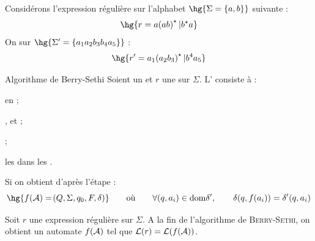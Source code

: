 \documentclass[a4paper,french,bookmarks]{book}
\begin{document}
    \begin{example}{}{}
        Considérons l'expression régulière  sur l'alphabet $\hg{\Sigma = \ens{a, b}}$ suivante :
        \[ \hg{r = a\p{ab}^\star \vert b^\star a}\]
        On  sur $\hg{\Sigma' = \ens{a_1a_2b_3b_4a_5}}$ :
        \[ \hg{r' = a_1\p{a_2b_3}^\star \vert b^4a_5 } \]
    \end{example}
    
    \begin{form}{Algorithme de Berry-Sethi}{}
        Soient \hg{$\Sigma$} un  et $r$ une  sur $\Sigma$. L' consiste à :
        
        \begin{psse}
            \item {} en  ;
            
            \item {},  et  ;
            
            \item {} ;
            
            \item {} les  dans les .
        \end{psse}
    \end{form}
    
    \begin{notation}
        Si  on obtient d'après l'étape  : 
        \[ \hg{f\p{\bcA} = \p{Q,\Sigma,q_0,F,\delta}} \qquad\text{où}\qquad \forall \p{q, a_i} \in \mathrm{dom}{\delta'},\qquad \delta\p{q,f(a_i)} = \delta'\p{q,a_i}\]
    \end{notation}
    
    \begin{theorem}{}{}
        Soit $r$ une expression régulière sur $\Sigma$. A la fin de l'algorithme de \textsc{Berry-Sethi}, on obtient un automate $f\!\left(\mathcal{A}\right)$ tel que $\mathcal{L}\!\left(r\right) = \mathcal{L}\!\left(f\!\left(\mathcal{A}\right)\right)$.
    \end{theorem}
    
\end{document}

